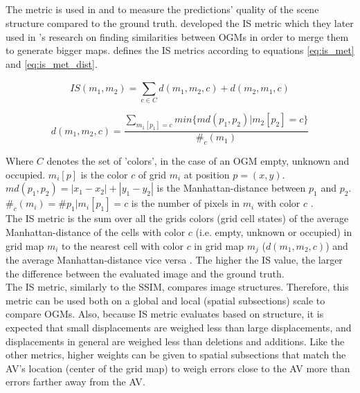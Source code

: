 \subsection{} \label{subsec:is_met}
The  metric is used in \cite{lange2020attention} and \cite{toyungyernsub2020double} to measure the predictions' quality of the scene structure compared to the ground truth. \cite{birk1996learning} developed the \gls{IS} metric which they later used in \cite{birk2006merging}'s research on finding similarities between \glspl{OGM} in order to merge them to generate bigger maps. \cite{birk1996learning} defines the \gls{IS} metrics according to  equations \ref{eq:is_met} and \ref{eq:is_met_dist}.


\begin{equation} \label{eq:is_met}
	IS(m_1, m_2) = \sum_{c \in C}^{}d(m_1, m_2,c) + d(m_2,m_1,c)
\end{equation}

\begin{equation} \label{eq:is_met_dist}
	d(m_1, m_2,c) = \frac{\sum_{m_1[p_1]=c}^{} min\{md(p_1, p_2)|m_2[p_2]=c\}}{\#_c(m_1)}
\end{equation}

Where $C$ denotes the set of 'colors', in the case of an \gls{OGM} empty, unknown and occupied. $m_i[p]$ is the color $c$ of grid $m_i$ at position $p=(x,y)$. $md(p_1,p_2) = |x_1 - x_2| + |y_1 - y_2|$ is the Manhattan-distance between $p_1$ and $p_2$. $\#_c(m_i) = \#{p_1|m_i[p_1] = c}$ is the number of pixels in $m_i$ with color $c$ \cite{birk1996learning}. \\
The \gls{IS} metric is the sum over all the grids colors (grid cell states) of the average Manhattan-distance of the cells with color $c$ (i.e. empty, unknown or occupied) in grid map $m_i$ to the nearest cell with color $c$ in grid map $m_j$ ($d(m_1, m_2,c)$) and the average Manhattan-distance vice versa \cite{birk1996learning}. The higher the \gls{IS} value, the larger the difference between the evaluated image and the ground truth. \\

The \gls{IS} metric, similarly to the \gls{SSIM}, compares image structures. Therefore, this metric can be used both on a global and local (spatial subsections) scale to compare \glspl{OGM}. Also, because \gls{IS} metric evaluates based on structure, it is expected that small displacements are weighed less than large displacements, and displacements in general are weighed less than deletions and additions. Like the other metrics, higher weights can be given to spatial subsections that match the \gls{AV}'s location (center of the grid map) to weigh errors close to the \gls{AV} more than errors farther away from the \gls{AV}.

